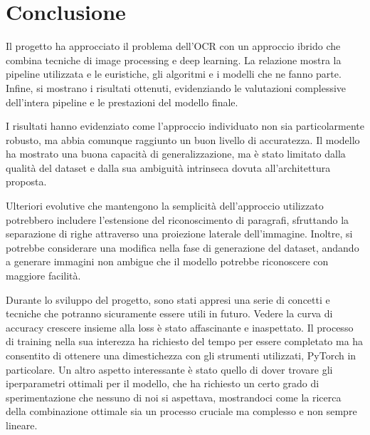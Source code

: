 \chapter{Conclusione}

Il progetto ha approcciato il problema dell'OCR con un approccio ibrido che combina tecniche di image processing e deep learning. La relazione mostra la pipeline utilizzata e le euristiche, gli algoritmi e i modelli che ne fanno parte. Infine, si mostrano i risultati ottenuti, evidenziando le valutazioni complessive dell'intera pipeline e le prestazioni del modello finale.

I risultati hanno evidenziato come l'approccio individuato non sia particolarmente robusto, ma abbia comunque raggiunto un buon livello di accuratezza. Il modello ha mostrato una buona capacità di generalizzazione, ma è stato limitato dalla qualità del dataset e dalla sua ambiguità intrinseca dovuta all'architettura proposta.

Ulteriori evolutive che mantengono la semplicità dell'approccio utilizzato potrebbero includere l'estensione del riconoscimento di paragrafi, sfruttando la separazione di righe attraverso una proiezione laterale dell'immagine. Inoltre, si potrebbe considerare una modifica nella fase di generazione del dataset, andando a generare immagini non ambigue che il modello potrebbe riconoscere con maggiore facilità.

Durante lo sviluppo del progetto, sono stati appresi una serie di concetti e tecniche che potranno sicuramente essere utili in futuro. Vedere la curva di accuracy crescere insieme alla loss è stato affascinante e inaspettato. Il processo di training nella sua interezza ha richiesto del tempo per essere completato ma ha consentito di ottenere una dimestichezza con gli strumenti utilizzati, PyTorch in particolare. Un altro aspetto interessante è stato quello di dover trovare gli iperparametri ottimali per il modello, che ha richiesto un certo grado di sperimentazione che nessuno di noi si aspettava, mostrandoci come la ricerca della combinazione ottimale sia un processo cruciale ma complesso e non sempre lineare.